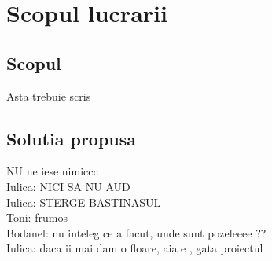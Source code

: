 \section{Scopul lucrarii}

\subsection{Scopul}

\quad Asta trebuie scris

\subsection{Solutia propusa}

\quad NU ne iese nimiccc \\
\quad Iulica: NICI SA NU AUD \\
\quad Iulica: STERGE BASTINASUL \\
\quad Toni: frumos \\
\quad Bodanel: nu inteleg ce a facut, unde sunt pozeleeee ?? \\
Iulica: daca ii mai dam o floare, aia e , gata proiectul
